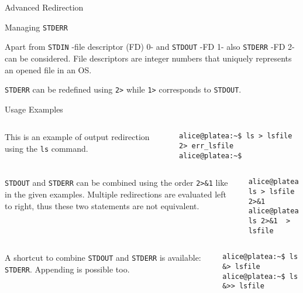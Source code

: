 \begin{frame}[t,fragile]{Advanced Redirection}

  \vspace{-0.3cm}
  \begin{block}{Managing \alert{\texttt{STDERR}}}
    {\footnotesize
 Apart from \alert{\texttt{STDIN}} -file descriptor (FD) 0- and \alert{\texttt{STDOUT}} -FD 1- also \alert{\texttt{STDERR}} -FD 2- can be considered. File descriptors are integer numbers that uniquely represents an opened file in an OS.

 \alert{\texttt{STDERR}} can be redefined using \alert{\texttt{2>}} while \alert{\texttt{1>}} corresponds to  \alert{\texttt{STDOUT}}.

  Usage Examples
}


\vspace{-0.3cm}
{\scriptsize

  \begin{columns}
       This is an example of output redirection using the \texttt{ls} command.
        \begin{lstlisting}
alice@platea:~$ ls > lsfile 2> err_lsfile
alice@platea:~$
        \end{lstlisting}
    \end{columns}
  \begin{columns}
      \texttt{STDOUT} and \texttt{STDERR} can be combined using the order \alert{\texttt{2>\&1}} like in the given examples. Multiple redirections are evaluated left to right, thus these two statements are not equivalent.
        \begin{lstlisting}
alice@platea:~$ ls > lsfile 2>&1 
alice@platea:~$ ls 2>&1  > lsfile 
        \end{lstlisting}
    \end{columns}
  \begin{columns}
     A shortcut to combine \texttt{STDOUT} and \texttt{STDERR} is available: \alert{\texttt{STDERR}}. Appending is possible too.
        \begin{lstlisting}
alice@platea:~$ ls &> lsfile
alice@platea:~$ ls &>> lsfile
        \end{lstlisting}
    \end{columns}
}
  \end{block}
  
\end{frame}

